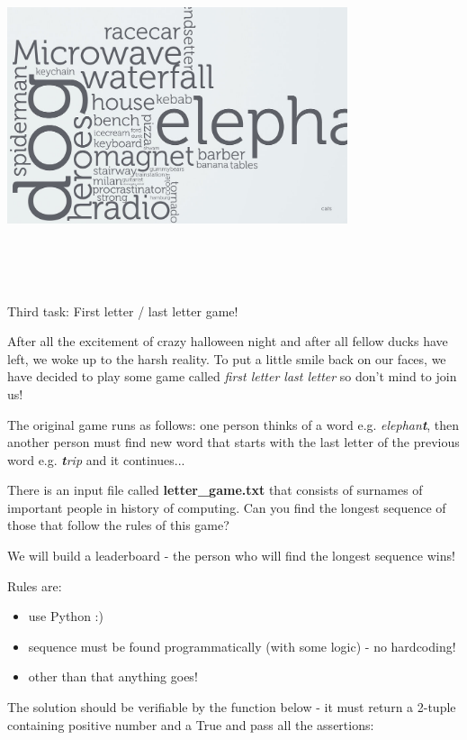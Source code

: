 \documentclass[12pt]{article}
\begin{document}
\newpage

\includegraphics[width=10cm,height=10cm,keepaspectratio]{img/wordcloud.jpg}

Third task: First letter / last letter game!

\vspace{0.5cm}
\begin{flushleft}

After all the excitement of crazy halloween night and after all fellow ducks have left, we woke up to the harsh reality. To put a little smile back on our faces, we have decided to play some game called \textit{first letter last letter} so don't mind to join us!

The original game runs as follows:
one person thinks of a word e.g. \textit{elephan\textbf{t}}, then another person must find new word that starts with the last letter of the previous word e.g. \textit{\textbf{t}rip} and it continues...
\vspace{0.5cm}

There is an input file called \textbf{letter\_game.txt} that consists of surnames of important people in history of computing. Can you find the longest sequence of those that follow the rules of this game?
\vspace{0.5cm}

We will build a leaderboard - the person who will find the longest sequence wins!

\vspace{0.5cm}

Rules are:
\begin{itemize}
  \item use Python :)
  \item sequence must be found programmatically (with some logic) - no hardcoding!
  \item other than that anything goes!
\end{itemize}
\vspace{0.25cm}

The solution should be verifiable by the function below - it must return a 2-tuple containing positive number and a True and pass all the assertions:
\end{flushleft}
\end{document}
